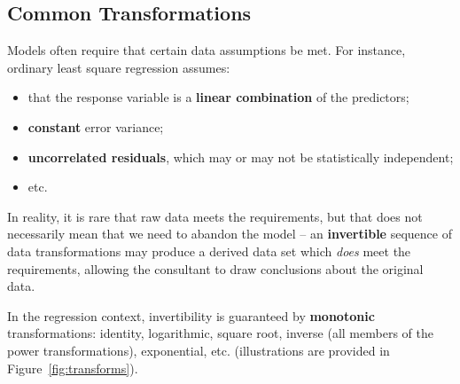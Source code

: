 \subsection{Common Transformations} Models often require that certain data assumptions be met. For instance, ordinary least square regression assumes:
\begin{itemize}[noitemsep]
\item that the response variable is a \textbf{linear combination} of the predictors;
\item \textbf{constant} error variance; 
\item \textbf{uncorrelated residuals}, which may or may not be statistically independent;
\item etc.
\end{itemize}
In reality, it is rare that raw data  meets the requirements, but that does not necessarily mean that we need to abandon the model -- an \textbf{invertible} sequence of data transformations may produce a derived data set which \textit{does} meet the requirements, allowing the consultant to draw conclusions about the original data. \par In the regression context, invertibility is guaranteed by \textbf{monotonic} transformations:  identity, logarithmic, square root, inverse (all members of the power transformations), exponential, etc. (illustrations are provided in Figure~\ref{fig:transforms}).
